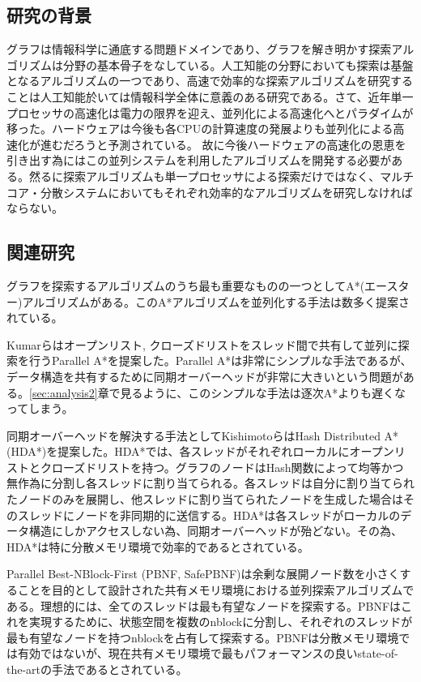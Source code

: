 \documentclass[uplatex]{jsarticle}
\begin{document}
\subsection{研究の背景}
グラフは情報科学に通底する問題ドメインであり、グラフを解き明かす探索アルゴリズムは分野の基本骨子をなしている。人工知能の分野においても探索は基盤となるアルゴリズムの一つであり、高速で効率的な探索アルゴリズムを研究することは人工知能於いては情報科学全体に意義のある研究である。さて、近年単一プロセッサの高速化は電力の限界を迎え、並列化による高速化へとパラダイムが移った。ハードウェアは今後も各CPUの計算速度の発展よりも並列化による高速化が進むだろうと予測されている。
故に今後ハードウェアの高速化の恩恵を引き出す為にはこの並列システムを利用したアルゴリズムを開発する必要がある。然るに探索アルゴリズムも単一プロセッサによる探索だけではなく、マルチコア・分散システムにおいてもそれぞれ効率的なアルゴリズムを研究しなければならない。


\subsection{関連研究}

グラフを探索するアルゴリズムのうち最も重要なものの一つとしてA*(エースター)アルゴリズムがある\cite{Hart1968}。このA*アルゴリズムを並列化する手法は数多く提案されている。
\newline


Kumarらはオープンリスト, クローズドリストをスレッド間で共有して並列に探索を行うParallel A*を提案した。Parallel A*は非常にシンプルな手法であるが、データ構造を共有するために同期オーバーヘッドが非常に大きいという問題がある。\ref{sec:analysis2}章で見るように、このシンプルな手法は逐次A*よりも遅くなってしまう。
\newline

同期オーバーヘッドを解決する手法としてKishimotoらはHash Distributed A*(HDA*)を提案した\cite{Kishimoto2013}。HDA*では、各スレッドがそれぞれローカルにオープンリストとクローズドリストを持つ。グラフのノードはHash関数によって均等かつ無作為に分割し各スレッドに割り当てられる。各スレッドは自分に割り当てられたノードのみを展開し、他スレッドに割り当てられたノードを生成した場合はそのスレッドにノードを非同期的に送信する。HDA*は各スレッドがローカルのデータ構造にしかアクセスしない為、同期オーバーヘッドが殆どない。その為、HDA*は特に分散メモリ環境で効率的であるとされている。
\newline

Parallel Best-NBlock-First (PBNF, SafePBNF)は余剰な展開ノード数を小さくすることを目的として設計された共有メモリ環境における並列探索アルゴリズムである\cite{Burns2010}。理想的には、全てのスレッドは最も有望なノードを探索する。PBNFはこれを実現するために、状態空間を複数のnblockに分割し、それぞれのスレッドが最も有望なノードを持つnblockを占有して探索する。PBNFは分散メモリ環境では有効ではないが、現在共有メモリ環境で最もパフォーマンスの良いstate-of-the-artの手法であるとされている。
\newline
\end{document}
